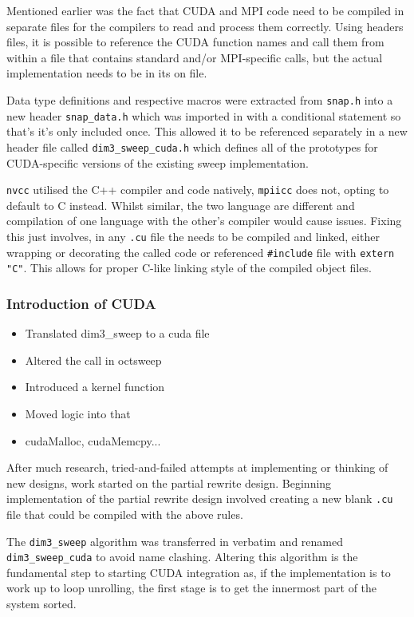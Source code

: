 \documentclass[conference]{IEEEtran}
\begin{document}
Mentioned earlier was the fact that CUDA and MPI code need to be compiled in separate files for the compilers to read and process them correctly. Using headers files, it is possible to reference the CUDA function names and call them from within a file that contains standard and/or MPI-specific calls, but the actual implementation needs to be in its on file.

Data type definitions and respective macros were extracted from \texttt{snap.h} into a new header \texttt{snap\_data.h} which was imported in with a conditional statement so that's it's only included once. This allowed it to be referenced separately in a new header file called \texttt{dim3\_sweep\_cuda.h} which defines all of the prototypes for CUDA-specific versions of the existing sweep implementation. 

\texttt{nvcc} utilised the C++ compiler and code natively, \texttt{mpiicc} does not, opting to default to C instead. Whilst similar, the two language are different and compilation of one language with the other's compiler would cause issues. Fixing this just involves, in any \texttt{.cu} file the needs to be compiled and linked, either wrapping or decorating the called code or referenced \texttt{\#include} file with \texttt{extern "C"}. This allows for proper C-like linking style of the compiled object files.


\subsubsection{Introduction of CUDA}

\begin{itemize}
    \item Translated dim3\_sweep to a cuda file
    \item Altered the call in octsweep
    \item Introduced a kernel function
    \item Moved logic into that
    \item cudaMalloc, cudaMemcpy...
\end{itemize}

After much research, tried-and-failed attempts at implementing or thinking of new designs, work started on the partial rewrite design. Beginning implementation of the partial rewrite design involved creating a new blank \texttt{.cu} file that could be compiled with the above rules.

The \texttt{dim3\_sweep} algorithm was transferred in verbatim and renamed \texttt{dim3\_sweep\_cuda} to avoid name clashing. Altering this algorithm is the fundamental step to starting CUDA integration as, if the implementation is to work up to loop unrolling, the first stage is to get the innermost part of the system sorted.
\end{document}
